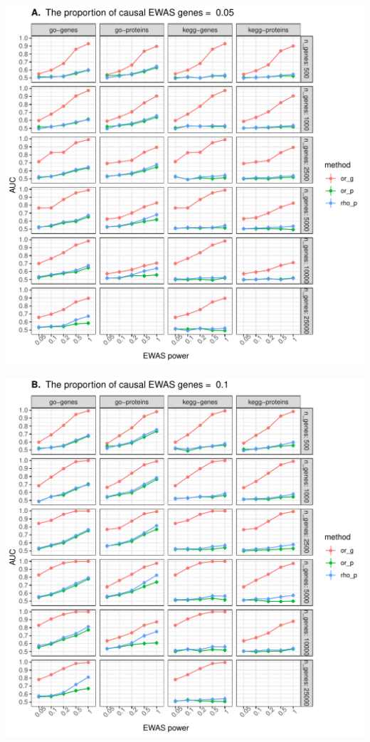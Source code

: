\documentclass[11pt,oneside]{bristolthesis}
\begin{document}
\begin{center}\includegraphics[width=1\linewidth]{figure/06-ewas_gwas_comparison/method_test_gene_v_protein/PEC_0.05} \end{center}
\begin{center}\includegraphics[width=1\linewidth]{figure/06-ewas_gwas_comparison/method_test_gene_v_protein/PEC_0.1} \end{center}
\end{document}

